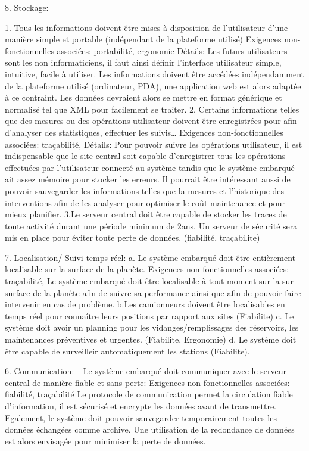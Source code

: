 8. Stockage:

1. Tous les informations doivent être mises à disposition de l'utilisateur d'une manière simple et portable (indépendant de la plateforme utilisé)
Exigences non-fonctionnelles associées: portabilité,  ergonomie
Détails: Les futurs utilisateurs sont les non informaticiens, il faut ainsi définir l’interface utilisateur simple, intuitive, facile à utiliser. Les informations doivent être accédées indépendamment de la plateforme utilisé (ordinateur, PDA), une application web est alors adaptée à ce contraint.  Les données devraient alors se mettre en format générique et normalisé tel que XML pour facilement se traiter.
2. Certains informations telles que des mesures ou des opérations utilisateur doivent être enregistrées pour afin d’analyser des statistiques, effectuer les suivis… 
Exigences non-fonctionnelles associées: traçabilité, 
Détails: Pour pouvoir suivre les opérations utilisateur, il est indispensable que le site central soit capable d’enregistrer tous les opérations effectuées par l’utilisateur connecté au système tandis que le système embarqué ait assez mémoire pour stocker les erreurs. Il pourrait être intéressant aussi de pouvoir sauvegarder les informations telles que la mesures et l’historique des interventions afin de les analyser pour optimiser le coût maintenance et pour mieux planifier.  
3.Le serveur central doit être capable de stocker les traces de toute activité durant une période minimum de 2ans. Un serveur de sécurité sera mis en place pour éviter toute perte de données. (fiabilité, traçabilite)

7. Localisation/ Suivi temps réel:
 a. Le système embarqué doit être entièrement localisable sur la surface de la planète. 
Exigences non-fonctionnelles associées: traçabilité, 
Le système embarqué doit être localisable à tout moment sur la sur surface de la planète afin de suivre sa performance ainsi que afin de pouvoir faire intervenir en cas de problème. 
b.Les camionneurs doivent être localisables en temps réel pour connaître leurs positions par rapport aux sites (Fiabilite)
c. Le système doit avoir un planning pour les vidanges/remplissages des réservoirs, les maintenances préventives et urgentes. (Fiabilite, Ergonomie)
d. Le système doit être capable de surveilleir automatiquement les stations (Fiabilite).

6. Communication:
+Le système embarqué doit communiquer avec le serveur central de manière fiable et sans perte:
Exigences non-fonctionnelles associées: fiabilité, traçabilité 
Le protocole de communication permet la circulation fiable d’information, il est sécurisé et encrypte les données avant de transmettre. Egalement, le système doit pouvoir sauvegarder temporairement toutes les données échangées comme archive. Une utilisation de la redondance de données est alors envisagée pour minimiser la perte de données.

